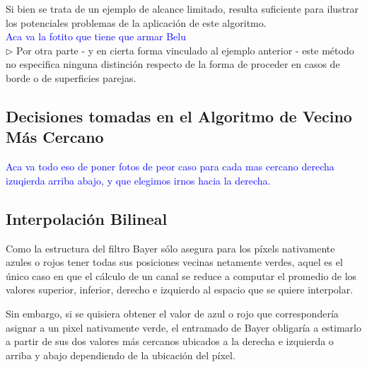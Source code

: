 \documentclass[a4paper]{article}
\begin{document}
Si bien se trata de un ejemplo de alcance limitado, resulta suficiente para ilustrar los potenciales problemas de la aplicación de este algoritmo.\\

\textcolor{blue}{Aca va la fotito que tiene que armar Belu}\\

$\triangleright$ Por otra parte - y en cierta forma vinculado al ejemplo anterior - este método no especifica ninguna distinción respecto de la forma de proceder en casos de borde o de superficies parejas. \\

\subsection*{Decisiones tomadas en el Algoritmo de Vecino M\'as Cercano}
\textcolor{blue}{Aca va todo eso de poner fotos de peor caso para cada mas cercano derecha izuqierda arriba abajo, y que elegimos irnos hacia la derecha.}

\subsection{Interpolaci\'on Bilineal}


Como la estructura del filtro Bayer sólo asegura para los p\'ixels nativamente azules o rojos tener todas sus posiciones vecinas netamente verdes, aquel es el único caso en que el cálculo de un canal se reduce a computar el promedio de los valores superior, inferior, derecho e izquierdo al espacio que se quiere interpolar.

Sin embargo, si se quisiera obtener el valor de azul o rojo que correspondería asignar a un pixel nativamente verde, el entramado de Bayer obligaría a estimarlo a partir de sus dos valores m\'as cercanos ubicados a la derecha e izquierda o arriba y abajo dependiendo de la ubicaci\'on del p\'ixel. 

\end{document}
